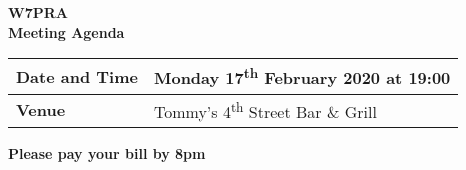 \documentclass[letter,11pt]{extarticle}
\begin{document}
	\thispagestyle{empty}
	
	\begin{center}
		\textbf{W7PRA\\Meeting Agenda}
		\vspace{0.33cm}
	\end{center}
	
	\begin{center}
		\begin{tabular}{| m{3.0cm} | m{7.5cm} |} \hline
			\textbf{Date and Time} & Monday 17\textsuperscript{th} February 2020 at 19:00 \\ \hline
			\textbf{Venue} & Tommy's 4\textsuperscript{th} Street Bar \& Grill \\ \hline
				\end{tabular}
	\end{center}
	
	\begin{center}
		\textbf{Please pay your bill by 8pm}
	\end{center}
	
\end{document}
